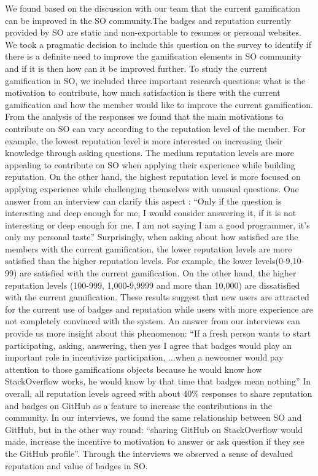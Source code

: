\documentclass{sigchi}
\begin{document}
We found based on the discussion with our team that the current gamification can be improved in the SO community.The badges and reputation currently provided by SO are static and non-exportable to resumes or personal websites. We took a pragmatic decision to include this question on the survey to identify if there is a definite need to improve the gamification elements in SO community and if it is then how can it be improved further. To study the current gamification in SO, we included three important research questions: what is the motivation to contribute, how much satisfaction is there with the current gamification and how the member would like to improve the current gamification. 
From the analysis of the responses we found that the main motivations to contribute on SO can vary according to the reputation level of the member. For example, the lowest reputation level is more interested on increasing their knowledge through asking questions. The medium reputation levels are more appealing to contribute on SO when applying their experience while building reputation. On the other hand, the highest reputation level is more focused on applying experience while challenging themselves with unusual questions. One answer from an interview can clarify this aspect : “Only if the question is interesting and deep enough for me, I would consider answering it, if it is not interesting or deep enough for me, I am not saying I am a good programmer, it’s only my personal taste”
Surprisingly, when asking about how satisfied are the members with the current gamification, the lower reputation levels are more satisfied than the higher reputation levels. For example, the lower levels(0-9,10-99) are satisfied with the current gamification. On the other hand, the higher  reputation levels (100-999, 1,000-9,9999 and more than 10,000) are dissatisfied with the current gamification. These results suggest that new users are attracted for the current use of badges and reputation while users with more experience are not completely convinced with the system. An answer from our interviews can provide us more insight about this phenomenon: “If a fresh person wants to start participating, asking, answering, then yes I agree that badges would play an important role in incentivize participation, ...when a newcomer would pay attention to those gamifications objects because he would know how StackOverflow works, he would know by that time that badges mean nothing”
In overall, all reputation levels agreed with about 40\% responses to share reputation and badges on GitHub as a feature to increase the contributions in the community. In our interviews, we found the same relationship between SO and GitHub, but in the other way round: “sharing GitHub on StackOverflow would made, increase the incentive to motivation to answer or ask question if they see the GitHub profile”. Through the interviews we observed a sense of devalued reputation and value of badges in SO.
\end{document}
